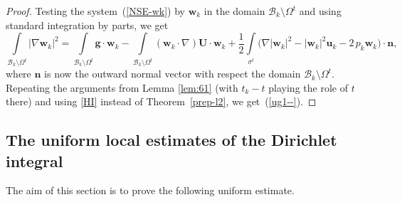\documentclass[11pt]{article}
\numberwithin{equation}{section}
\numberwithin{figure}{section}
\def\ue{{\mathbf u}}
\def\n{{\mathbf n}}
\def\we{{\mathbf w}}
\begin{document}
\begin{proof}
	Testing the system~(\ref{NSE-wk}) by $\we_k$ in the domain $ \mathcal{B}_k \setminus \Omega^t$ and using standard integration by parts, we get
	\begin{equation}\label{ug9-}
		\int\limits_{ \mathcal{B}_k \setminus \Omega^t}|\nabla\we_k|^2=\int\limits_{ \mathcal{B}_k \setminus \Omega^t}\mathbf{g}\cdot\we_k-\int\limits_{ \mathcal{B}_k \setminus \Omega^t}(\mathbf{w}_k \cdot \nabla) \mathbf{U}\cdot\we_k+\frac12\int\limits_{\sigma^t}\biggl(\nabla |\we_k|^2-|\we_k|^2\ue_k-2\,p_k\we_k\biggr)\cdot\n,
	\end{equation}
	where $\mathbf{n}$ is now the outward normal vector with respect the domain $ \mathcal{B}_k \setminus \Omega^t$. Repeating the arguments from Lemma \ref{lem:61} (with $t_k-t$ playing the role of $t$ there)  and using \eqref{HI} instead of Theorem~\ref{prep-l2}, we get~(\ref{ug1--}).
\end{proof}




\subsection{The  uniform local estimates  of the Dirichlet integral}
\label{poet7}

The aim of this section is to prove the following uniform estimate.
\end{document}
